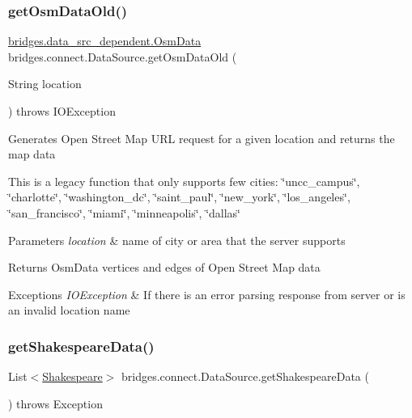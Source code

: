 \subsubsection{\texorpdfstring{get\+Osm\+Data\+Old()}{getOsmDataOld()}}
{\footnotesize\ttfamily \hyperlink{classbridges_1_1data__src__dependent_1_1_osm_data}{bridges.\+data\+\_\+src\+\_\+dependent.\+Osm\+Data} bridges.\+connect.\+Data\+Source.\+get\+Osm\+Data\+Old (\begin{DoxyParamCaption}\item[{String}]{location }\end{DoxyParamCaption}) throws I\+O\+Exception}

Generates Open Street Map U\+RL request for a given location and returns the map data

This is a legacy function that only supports few cities\+: \char`\"{}uncc\+\_\+campus\char`\"{}, \char`\"{}charlotte\char`\"{}, \char`\"{}washington\+\_\+dc\char`\"{}, \char`\"{}saint\+\_\+paul\char`\"{}, \char`\"{}new\+\_\+york\char`\"{}, \char`\"{}los\+\_\+angeles\char`\"{}, \char`\"{}san\+\_\+francisco\char`\"{}, \char`\"{}miami\char`\"{}, \char`\"{}minneapolis\char`\"{}, \char`\"{}dallas\char`\"{}


\begin{DoxyParams}{Parameters}
{\em location} & name of city or area that the server supports \\
\hline
\end{DoxyParams}
\begin{DoxyReturn}{Returns}
Osm\+Data vertices and edges of Open Street Map data 
\end{DoxyReturn}

\begin{DoxyExceptions}{Exceptions}
{\em I\+O\+Exception} & If there is an error parsing response from server or is an invalid location name \\
\hline
\end{DoxyExceptions}
\mbox{\label{classbridges_1_1connect_1_1_data_source_af2b6e5df074d0a689e8a992b1bea6f3e}} 
\subsubsection{\texorpdfstring{get\+Shakespeare\+Data()}{getShakespeareData()}\hspace{0.1cm}{\footnotesize\ttfamily [1/3]}}
{\footnotesize\ttfamily List$<$\hyperlink{classbridges_1_1data__src__dependent_1_1_shakespeare}{Shakespeare}$>$ bridges.\+connect.\+Data\+Source.\+get\+Shakespeare\+Data (\begin{DoxyParamCaption}{ }\end{DoxyParamCaption}) throws Exception}



